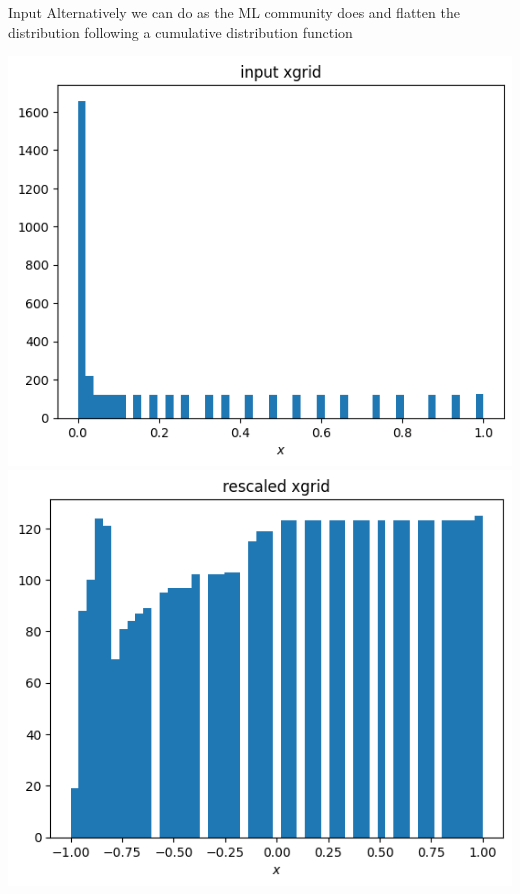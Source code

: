 \documentclass[aspectratio=169, 8pt,t]{beamer}
\begin{document}
\begin{frame}{Input}
  Alternatively we can do as the ML community does and flatten the distribution following a cumulative distribution function
  \begin{center}
    \includegraphics[height=0.55\textheight]{unscaledxgrid.png}
    \includegraphics[height=0.55\textheight]{scaledxgrid.png}
  \end{center}
\end{frame}
\end{document}
